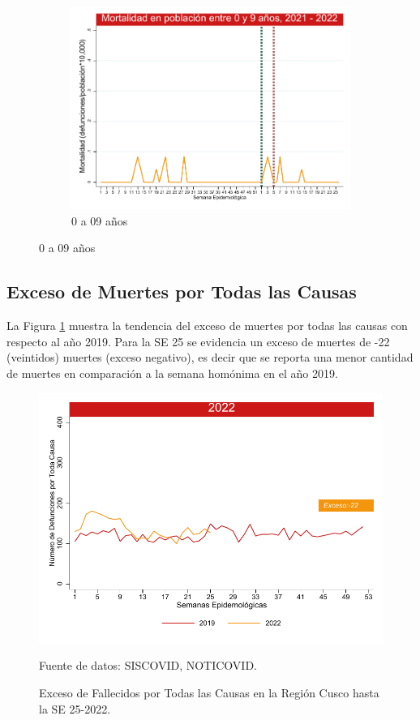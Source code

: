 \documentclass[12pt,a4paper,openany]{book}
\begin{document}
\begin{figure}[h]
		\vspace{10mm}
		\begin{subfigure}[b]{0.45\textwidth}
			\centering
			\includegraphics[width=\textwidth]{../figuras/mortalidad_edad_0.pdf}
			\caption{0 a 09 años}
		\end{subfigure}
	\end{figure}
	\clearpage	
	\subsection*{Exceso de Muertes por Todas las Causas}
	\noindent La Figura \ref{fig:exceso_regional} muestra la tendencia del exceso de muertes por todas las causas con respecto al año 2019. Para la SE 25 se evidencia un exceso de muertes de -22 (veintidos) muertes (exceso negativo), es
	decir que se reporta una menor cantidad de muertes en comparación a la semana homónima en el año 2019.
	
	
	
	\begin{figure}[h]
		\caption{Exceso de Fallecidos por Todas las Causas en la Región Cusco hasta la SE 25-2022.}\label{fig:exceso_regional}
		\begin{center}
			\includegraphics[width=0.85\linewidth]{../figuras/exceso_region_2022.pdf}
		\end{center}
		{\footnotesize {Fuente de datos: SISCOVID, NOTICOVID.}}
	\end{figure}
	\clearpage
	
\end{document}
